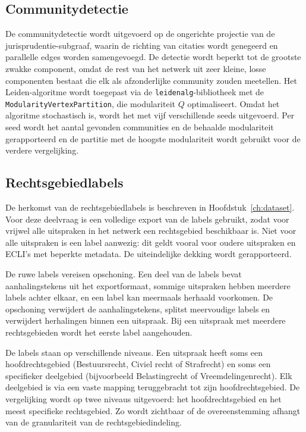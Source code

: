 \documentclass[a4paper, 12pt]{report}
\begin{document}
\subsection{Communitydetectie} De communitydetectie wordt uitgevoerd op de ongerichte projectie van de jurisprudentie-subgraaf, waarin de richting van citaties wordt genegeerd en parallelle edges worden samengevoegd. De detectie wordt beperkt tot de grootste zwakke component, omdat de rest van het netwerk uit zeer kleine, losse componenten bestaat die elk als afzonderlijke community zouden meetellen. Het Leiden-algoritme \parencite{traag2019} wordt toegepast via de \texttt{leidenalg}-bibliotheek met de \texttt{ModularityVertexPartition}, die modulariteit $Q$ \parencite{newman2006} optimaliseert. Omdat het algoritme stochastisch is, wordt het met vijf verschillende seeds uitgevoerd. Per seed wordt het aantal gevonden communities en de behaalde modulariteit gerapporteerd en de partitie met de hoogste modulariteit wordt gebruikt voor de verdere vergelijking.


\subsection{Rechtsgebiedlabels} De herkomst van de rechtsgebiedlabels is beschreven in Hoofdstuk~\ref{ch:dataset}. Voor deze deelvraag is een volledige export van de labels gebruikt, zodat voor vrijwel alle uitspraken in het netwerk een rechtsgebied beschikbaar is. Niet voor alle uitspraken is een label aanwezig: dit geldt vooral voor oudere uitspraken en ECLI's met beperkte metadata. De uiteindelijke dekking wordt gerapporteerd.

De ruwe labels vereisen opschoning. Een deel van de labels bevat aanhalingstekens uit het exportformaat, sommige uitspraken hebben meerdere labels achter elkaar, en een label kan meermaals herhaald voorkomen. De opschoning verwijdert de aanhalingstekens, splitst meervoudige labels en verwijdert herhalingen binnen een uitspraak. Bij een uitspraak met meerdere rechtsgebieden wordt het eerste label aangehouden.

De labels staan op verschillende niveaus. Een uitspraak heeft soms een hoofdrechtsgebied (Bestuursrecht, Civiel recht of Strafrecht) en soms een specifieker deelgebied (bijvoorbeeld Belastingrecht of Vreemdelingenrecht). Elk deelgebied is via een vaste mapping teruggebracht tot zijn hoofdrechtsgebied. De vergelijking wordt op twee niveaus uitgevoerd: het hoofdrechtsgebied en het meest specifieke rechtsgebied. Zo wordt zichtbaar of de overeenstemming afhangt van de granulariteit van de rechtsgebiedindeling.
\end{document}
